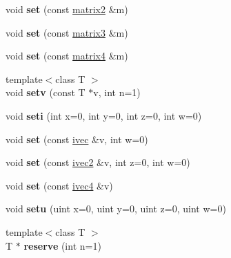 \begin{DoxyCompactItemize}
void {\bfseries set} (const \hyperlink{structmatrix2}{matrix2} \&m)
\item 
\mbox{\label{struct_global_shader_param_a59c61ee3de5dd1de892564027c22dc0e}} 
void {\bfseries set} (const \hyperlink{structmatrix3}{matrix3} \&m)
\item 
\mbox{\label{struct_global_shader_param_ac0172bf8e7bf4ab726bc545c27d23018}} 
void {\bfseries set} (const \hyperlink{structmatrix4}{matrix4} \&m)
\item 
\mbox{\label{struct_global_shader_param_abf0e57fb74c837f17476036c073708a8}} 
{\footnotesize template$<$class T $>$ }\\void {\bfseries setv} (const T $\ast$v, int n=1)
\item 
\mbox{\label{struct_global_shader_param_a34b6b3838528a7eacd5a120e2f35e1f1}} 
void {\bfseries seti} (int x=0, int y=0, int z=0, int w=0)
\item 
\mbox{\label{struct_global_shader_param_add582cc877e9f4802ff781c2e9ffd23d}} 
void {\bfseries set} (const \hyperlink{structivec}{ivec} \&v, int w=0)
\item 
\mbox{\label{struct_global_shader_param_ad29287e99b91674e0e718fc8450b6732}} 
void {\bfseries set} (const \hyperlink{structivec2}{ivec2} \&v, int z=0, int w=0)
\item 
\mbox{\label{struct_global_shader_param_adfa05cab63b05f126df074b85f0cc6d9}} 
void {\bfseries set} (const \hyperlink{structivec4}{ivec4} \&v)
\item 
\mbox{\label{struct_global_shader_param_a8f8ba9098ceae4a0b3241f9d452fbd8a}} 
void {\bfseries setu} (uint x=0, uint y=0, uint z=0, uint w=0)
\item 
\mbox{\label{struct_global_shader_param_a983a6285407cf540ce144d83846d96df}} 
{\footnotesize template$<$class T $>$ }\\T $\ast$ {\bfseries reserve} (int n=1)
\end{DoxyCompactItemize}
